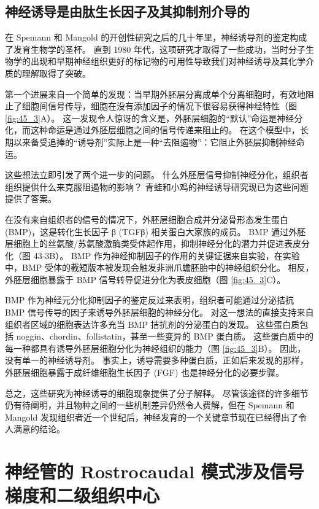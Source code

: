 \subsection{神经诱导是由肽生长因子及其抑制剂介导的}

在 Spemann 和 Mangold 的开创性研究之后的几十年里，神经诱导剂的鉴定构成了发育生物学的圣杯。
直到 1980 年代，这项研究才取得了一些成功，当时分子生物学的出现和早期神经组织更好的标记物的可用性导致我们对神经诱导及其化学介质的理解取得了突破。


第一个进展来自一个简单的发现：当早期外胚层分离成单个分离细胞时，有效地阻止了细胞间信号传导，细胞在没有添加因子的情况下很容易获得神经特性（图 \ref{fig:45_3}A）。
这一发现令人惊讶的含义是，外胚层细胞的“默认”命运是神经分化，而这种命运是通过外胚层细胞之间的信号传递来阻止的。
在这个模型中，长期以来备受追捧的“诱导剂”实际上是一种“去阻遏物”：它阻止外胚层抑制神经命运。


这些想法立即引发了两个进一步的问题。
什么外胚层信号抑制神经分化，组织者组织提供什么来克服阻遏物的影响？
青蛙和小鸡的神经诱导研究现已为这些问题提供了答案。


在没有来自组织者的信号的情况下，外胚层细胞合成并分泌骨形态发生蛋白 (BMP)，这是转化生长因子 β (TGFβ) 相关蛋白大家族的成员。
BMP 通过外胚层细胞上的丝氨酸/苏氨酸激酶类受体起作用，抑制神经分化的潜力并促进表皮分化（图 43-3B）。
BMP 作为神经抑制因子的作用的关键证据来自实验，在实验中，BMP 受体的截短版本被发现会触发非洲爪蟾胚胎中的神经组织分化。
相反，外胚层细胞暴露于 BMP 信号转导促进分化为表皮细胞（图 \ref{fig:45_3}C）。


BMP 作为神经元分化抑制因子的鉴定反过来表明，组织者可能通过分泌拮抗 BMP 信号传导的因子来诱导外胚层细胞的神经分化。
对这一想法的直接支持来自组织者区域的细胞表达许多充当 BMP 拮抗剂的分泌蛋白的发现。
这些蛋白质包括 noggin、chordin、follistatin，甚至一些变异的 BMP 蛋白质。
这些蛋白质中的每一种都具有诱导外胚层细胞分化为神经组织的能力（图 \ref{fig:45_3}B）。
因此，没有单一的神经诱导剂。
事实上，诱导需要多种蛋白质，正如后来发现的那样，外胚层细胞暴露于成纤维细胞生长因子 (FGF) 也是神经分化的必要步骤。


总之，这些研究为神经诱导的细胞现象提供了分子解释。 尽管该途径的许多细节仍有待阐明，并且物种之间的一些机制差异仍然令人费解，但在 Spemann 和 Mangold 发现组织者近一个世纪后，神经发育的一个关键章节现在已经得出了令人满意的结论。



\section{神经管的 Rostrocaudal 模式涉及信号梯度和二级组织中心}

